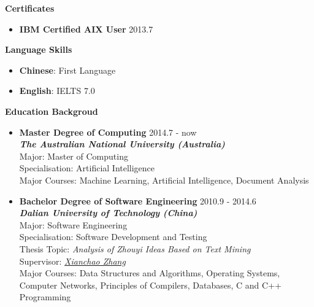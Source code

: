 \documentclass{res}
\newcommand{\resheading}[1]{{\normalsize \colorbox{mygrey}{\begin{minipage}{\textwidth}{\textbf{#1 \vphantom{p\^{E}}}}\end{minipage}}}}
\begin{document}
\begin{resume}
\begin{CJK*}{UTF8}{song}
\begin{itemize}
\end{itemize}



\resheading{Certificates}

\begin{itemize}
\itemsep -2pt %
  \item{\bf IBM Certified AIX User} \hfill 2013.7
\end{itemize}



\resheading{Language Skills}

\begin{itemize}
\itemsep -2pt %
  \item{\bf Chinese}: First Language	
  \item{\bf English}: IELTS 7.0
\end{itemize}






\resheading{Education Backgroud}

\begin{itemize}
  \item{\bf Master Degree of Computing} \hfill 2014.7 - now \\
  					  \textbf{\textit{The Australian National University (Australia)}} \\
                      Major: Master of Computing \\
                      Specialisation: Artificial Intelligence \\
                      Major Courses: Machine Learning, Artificial Intelligence, Document Analysis
  \item{\bf Bachelor Degree of Software Engineering}   \hfill 2010.9 - 2014.6 \\
  \textbf{\textit{Dalian University of Technology (China)}} \\
                      Major: Software Engineering\\
                      Specialisation: Software Development and Testing \\
                      Thesis Topic: \textit{Analysis of Zhouyi Ideas Based on Text Mining} \\
                      Supervisor: \href{https://sciforschenonline.org/journals/computer-science-informatics/xianchao-zhang.php}{\textit{Xianchao Zhang}} \\
                      Major Courses: Data Structures and Algorithms, Operating Systems, Computer Networks, Principles of Compilers, Databases, C and C++ Programming
\end{itemize}



\end{CJK*}
\end{resume}
\end{document}

